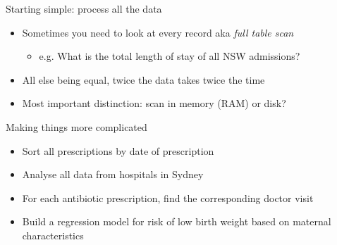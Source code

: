 \documentclass[aspectratio=169,12pt,usepdftitle=false]{beamer} %
\begin{document}
\begin{frame}{Starting simple: process all the data}
    \begin{itemize}
	\item Sometimes you need to look at every record aka \emph{full table scan}
	    \begin{itemize}
		\item e.g. What is the total length of stay of all NSW admissions?
	    \end{itemize}
	\item All else being equal, twice the data takes twice the time
	\item Most important distinction: scan in memory (RAM) or disk?
    \end{itemize}
\end{frame}

\begin{frame}{Making things more complicated}
    \begin{itemize}
	\item Sort all prescriptions by date of prescription
	\item Analyse all data from hospitals in Sydney
	\item For each antibiotic prescription, find the corresponding doctor visit
	\item Build a regression model for risk of low birth weight based on maternal characteristics
    \end{itemize}
\end{frame}

{
\begin{frame}[plain]
\end{frame}
}
\end{document}
